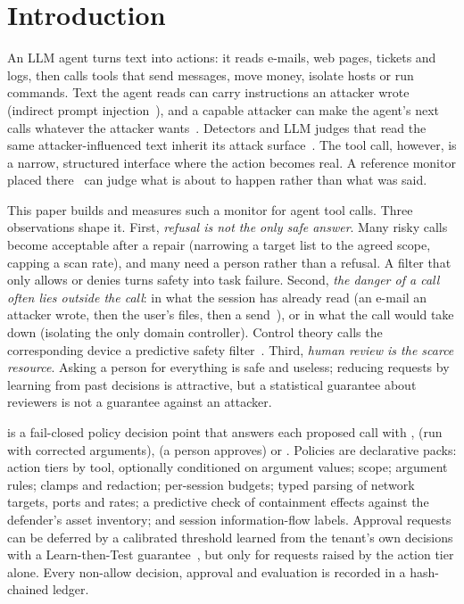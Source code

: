 \section{Introduction}
\label{sec:intro}

An LLM agent turns text into actions: it reads e-mails, web pages, tickets and logs, then calls tools that send messages, move money, isolate hosts or run commands. Text the agent reads can carry instructions an attacker wrote (indirect prompt injection~\cite{greshake,injecagent,agentdojo}), and a capable attacker can make the agent's next calls whatever the attacker wants~\cite{adaptiveattacks}. Detectors and LLM judges that read the same attacker-influenced text inherit its attack surface~\cite{adaptiveattacks,shadearena}. The tool call, however, is a narrow, structured interface where the action becomes real. A reference monitor placed there~\cite{anderson,saltzer} can judge what is about to happen rather than what was said.

This paper builds and measures such a monitor for agent tool calls. Three observations shape it.
First, \emph{refusal is not the only safe answer}. Many risky calls become acceptable after a repair (narrowing a target list to the agreed scope, capping a scan rate), and many need a person rather than a refusal. A filter that only allows or denies turns safety into task failure.
Second, \emph{the danger of a call often lies outside the call}: in what the session has already read (an e-mail an attacker wrote, then the user's files, then a send~\cite{trifecta,ruleoftwo}), or in what the call would take down (isolating the only domain controller). Control theory calls the corresponding device a predictive safety filter~\cite{wabersich,hsu}.
Third, \emph{human review is the scarce resource}. Asking a person for everything is safe and useless; reducing requests by learning from past decisions is attractive, but a statistical guarantee about reviewers is not a guarantee against an attacker.

\SystemNameCap{} is a fail-closed policy decision point that answers each proposed call with ,  (run with corrected arguments),  (a person approves) or . Policies are declarative packs: action tiers by tool, optionally conditioned on argument values; scope; argument rules; clamps and redaction; per-session budgets; typed parsing of network targets, ports and rates; a predictive check of containment effects against the defender's asset inventory; and session information-flow labels. Approval requests can be deferred by a calibrated threshold learned from the tenant's own decisions with a Learn-then-Test guarantee~\cite{ltt}, but only for requests raised by the action tier alone. Every non-allow decision, approval and evaluation is recorded in a hash-chained ledger.

